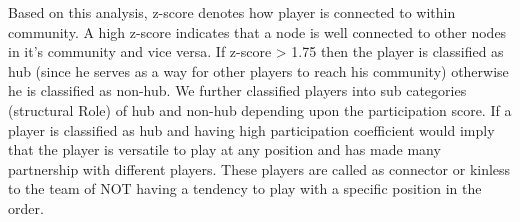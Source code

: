 \documentclass{article}
\begin{document}
Based on this analysis, z-score denotes how player is connected to within community. A high z-score indicates that a node is well connected to other nodes in it's community and vice versa. If z-score > 1.75 then the player is classified as hub (since he serves as a way for other players to reach his community) otherwise he is classified as non-hub. We further classified players into sub categories (structural Role) of hub and non-hub depending upon the participation score. If a player is classified as hub and having high participation coefficient would imply that the player is versatile to play at any position and has made many partnership with different players. These players are called as connector or kinless to the team of NOT having a tendency to play with a specific position in the order.
\begin{table}[!h]
\end{table}
\end{document}

